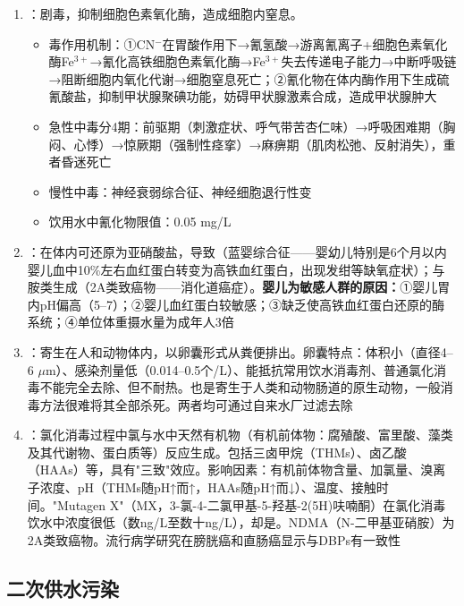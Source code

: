 \begin{enumerate}[leftmargin=*]
    \item {}：剧毒，抑制细胞色素氧化酶，造成细胞内窒息。
    \begin{itemize}
        \item 毒作用机制：①CN$^-$在胃酸作用下→氰氢酸→游离氰离子+细胞色素氧化酶Fe$^{3+}$→氰化高铁细胞色素氧化酶→Fe$^{3+}$失去传递电子能力→中断呼吸链→阻断细胞内氧化代谢→细胞窒息死亡；②氰化物在体内酶作用下生成硫氰酸盐，抑制甲状腺聚碘功能，妨碍甲状腺激素合成，造成甲状腺肿大
        \item 急性中毒分4期：前驱期（刺激症状、呼气带苦杏仁味）→呼吸困难期（胸闷、心悸）→惊厥期（强制性痉挛）→麻痹期（肌肉松弛、反射消失），重者昏迷死亡
        \item 慢性中毒：神经衰弱综合征、神经细胞退行性变
        \item 饮用水中氰化物限值：0.05 mg/L
    \end{itemize}
    \item {}：在体内可还原为亚硝酸盐，导致（蓝婴综合征——婴幼儿特别是6个月以内婴儿血中10\%左右血红蛋白转变为高铁血红蛋白，出现发绀等缺氧症状）；与胺类生成（2A类致癌物——消化道癌症）。\textbf{婴儿为敏感人群的原因：}①婴儿胃内pH偏高（5--7）；②婴儿血红蛋白较敏感；③缺乏使高铁血红蛋白还原的酶系统；④单位体重摄水量为成年人3倍
    \item {}：寄生在人和动物体内，以卵囊形式从粪便排出。卵囊特点：体积小（直径4--6 $\mu$m）、感染剂量低（0.014--0.5个/L）、能抵抗常用饮水消毒剂、普通氯化消毒不能完全去除、但不耐热。也是寄生于人类和动物肠道的原生动物，一般消毒方法很难将其全部杀死。两者均可通过自来水厂过滤去除
    \item {}：氯化消毒过程中氯与水中天然有机物（有机前体物：腐殖酸、富里酸、藻类及其代谢物、蛋白质等）反应生成。包括三卤甲烷（THMs）、卤乙酸（HAAs）等，具有"三致"效应。影响因素：有机前体物含量、加氯量、溴离子浓度、pH（THMs随pH↑而↑，HAAs随pH↑而↓）、温度、接触时间。"Mutagen X"（MX，3-氯-4-二氯甲基-5-羟基-2(5H)呋喃酮）在氯化消毒饮水中浓度很低（数ng/L至数十ng/L），却是。NDMA（N-二甲基亚硝胺）为2A类致癌物。流行病学研究在膀胱癌和直肠癌显示与DBPs有一致性
\end{enumerate}

\subsection{二次供水污染}

